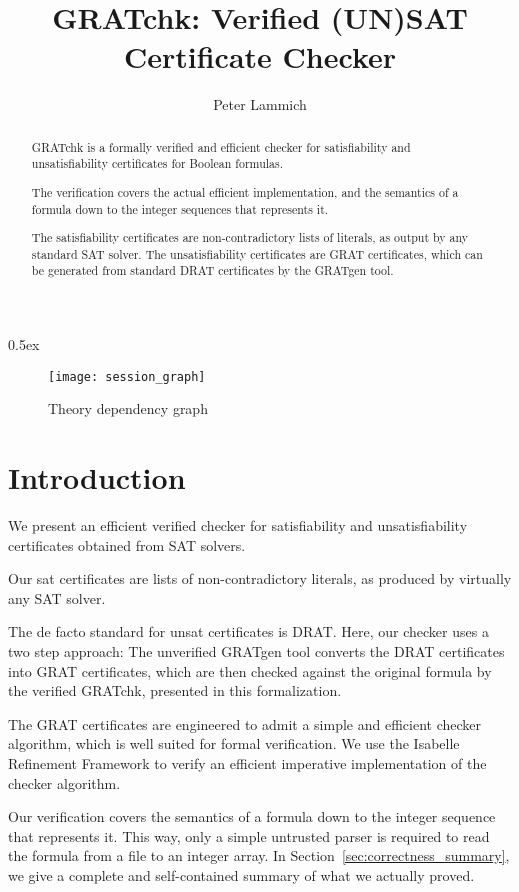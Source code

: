 \documentclass[10pt,a4paper]{article}
\begin{document}
\title{GRATchk: Verified (UN)SAT Certificate Checker}
\author{Peter Lammich}

\maketitle

\begin{abstract}
\noindent
GRATchk is a formally verified and efficient checker for satisfiability and 
unsatisfiability certificates for Boolean formulas.

The verification covers the actual efficient implementation, and 
the semantics of a formula down to the integer sequences that represents it.

The satisfiability certificates are non-contradictory lists of literals, 
as output by any standard SAT solver. The unsatisfiability certificates are 
GRAT certificates, which can be generated from standard DRAT certificates 
by the GRATgen tool.
\end{abstract}

\tableofcontents

\parindent 0pt
\parskip 0.5ex

\clearpage
\begin{figure}[h!]
\begin{center}
  \texttt{[image: session\_graph]}
\end{center}
\caption{Theory dependency graph}
\label{fig:thys}
\end{figure}
\clearpage

\section{Introduction}
We present an efficient verified checker for satisfiability and unsatisfiability
certificates obtained from SAT solvers. 

Our sat certificates are lists of non-contradictory literals, 
as produced by virtually any SAT solver.

The de facto standard for unsat certificates is DRAT. 
Here, our checker uses a two step approach: 
The unverified GRATgen tool converts the DRAT certificates into GRAT certificates, 
which are then checked against the original formula by the verified GRATchk, 
presented in this formalization.

The GRAT certificates are engineered to admit a simple and efficient checker
algorithm, which is well suited for formal verification. 
We use the Isabelle Refinement Framework to verify an efficient imperative
implementation of the checker algorithm.

Our verification covers the semantics of a formula down to the integer sequence
that represents it. This way, only a simple untrusted parser is required to 
read the formula from a file to an integer array. 
In Section~\ref{sec:correctness_summary}, we give a complete and self-contained
summary of what we actually proved.



%
%
 
% 
% 
\end{document}
